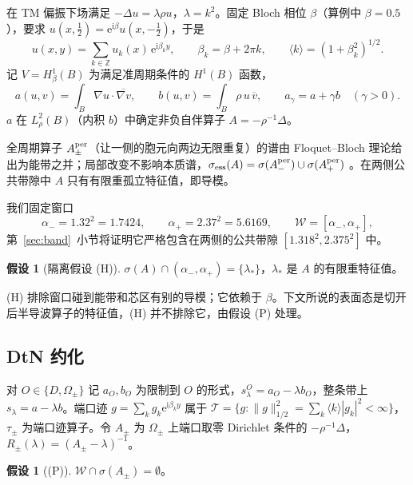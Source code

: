 \documentclass[11pt,a4paper,fontset=fandol]{ctexart}
\newcommand{\ii}{\mathrm{i}}
\newcommand{\ee}{\mathrm{e}}
\newcommand{\Tr}{\mathcal T}
\theoremstyle{plain}
\theoremstyle{definition}
\newtheorem{assumption}[theorem]{假设}
\theoremstyle{remark}
\begin{document}
在 TM 偏振下场满足 $-\Delta u=\lambda\rho u$，$\lambda=k^2$。固定 Bloch 相位 $\beta$（算例中 $\beta=0.5$），要求 $u(x,\tfrac12)=\ee^{\ii\beta}u(x,-\tfrac12)$，于是
\begin{equation}
\label{eq:fourier-y}
u(x,y)=\sum_{k\in\mathbb Z}u_k(x)\,\ee^{\ii\beta_ky},\qquad\beta_k=\beta+2\pi k,\qquad\langle k\rangle=(1+\beta_k^2)^{1/2}.
\end{equation}
记 $V=H^1_\beta(B)$ 为满足准周期条件的 $H^1(B)$ 函数，
\[
a(u,v)=\int_B\nabla u\cdot\overline{\nabla v},\qquad b(u,v)=\int_B\rho\,u\,\overline v,\qquad a_\gamma=a+\gamma b\quad(\gamma>0).
\]
$a$ 在 $L^2_\rho(B)$（内积 $b$）中确定非负自伴算子 $A=-\rho^{-1}\Delta$。

全周期算子 $A^{\rm per}_\pm$（让一侧的胞元向两边无限重复）的谱由 Floquet--Bloch 理论给出为能带之并；局部改变不影响本质谱，$\sigma_{\rm ess}(A)=\sigma(A^{\rm per}_-)\cup\sigma(A^{\rm per}_+)$ \cite{ReedSimon1978,Fliss2013}。在两侧公共带隙中 $A$ 只有有限重孤立特征值，即导模。

我们固定窗口
\begin{equation}
\label{eq:window}
\alpha_-=1.32^2=1.7424,\qquad\alpha_+=2.37^2=5.6169,\qquad\mathcal W=[\alpha_-,\alpha_+],
\end{equation}
第~\ref{sec:band}~小节将证明它严格包含在两侧的公共带隙 $[1.318^2,2.375^2]$ 中。

\begin{assumption}[隔离假设 (H)]
\label{ass:H}
$\sigma(A)\cap(\alpha_-,\alpha_+)=\{\lambda_*\}$，$\lambda_*$ 是 $A$ 的有限重特征值。
\end{assumption}

(H) 排除窗口碰到能带和芯区有别的导模；它依赖于 $\beta$。下文所说的表面态是切开后半导波算子的特征值，(H) 并不排除它，由假设 (P) 处理。

\subsection{DtN 约化}

对 $O\in\{D,\Omega_\pm\}$ 记 $a_O,b_O$ 为限制到 $O$ 的形式，$s^O_\lambda=a_O-\lambda b_O$，整条带上 $s_\lambda=a-\lambda b$。端口迹 $g=\sum_kg_k\ee^{\ii\beta_ky}$ 属于 $\Tr=\{g:\|g\|_{1/2}^2=\sum_k\langle k\rangle|g_k|^2<\infty\}$，$\tau_\pm$ 为端口迹算子。令 $A_\pm$ 为 $\Omega_\pm$ 上端口取零 Dirichlet 条件的 $-\rho^{-1}\Delta$，$R_\pm(\lambda)=(A_\pm-\lambda)^{-1}$。

\begin{assumption}[(P)]
\label{ass:P}
$\mathcal W\cap\sigma(A_\pm)=\emptyset$。
\end{assumption}
\end{document}
